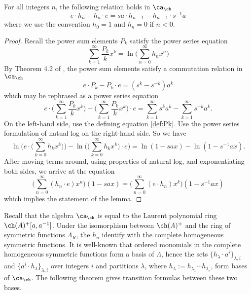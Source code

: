 \begin{lemma} \label{lem:homfly1}
For all integers $n$, the following relation holds in $\ca_\ch$
\begin{equation}
e \cdot h_n - h_n \cdot e = s a \cdot h_{n-1} - h_{n-1} \cdot  s^{-1} a
\end{equation}
where we use the convention $h_0 = 1$ and $h_n = 0$ if $n < 0$. 
\end{lemma}
\begin{proof}
Recall the power sum elements $P_k$ satisfy the power series equation
\begin{equation} \label{def:Pk}
\sum_{k=1}^\infty \frac{P_k}{k} x^k = \ln \Big( \sum_{n=0}^\infty h_n x^n \Big)
\end{equation}
By Theorem 4.2 of \cite{Mor02b}, the power sum elements satisfy a commutation relation in $\ca_\ch$
\begin{equation}
e \cdot P_k - P_k \cdot e = (s^{k} - s^{-k}) a^k
\end{equation} 
which may be rephrased as a power series equation 
\[
e \cdot \Big( \sum_{k=1}^\infty \frac{P_k}{k} x^k \Big) - \Big( \sum_{k=1}^\infty \frac{P_k}{k} x^k \Big) \cdot e = \sum_{k=1}^\infty s^k a^k - \sum_{k=1}^\infty s^{-k} a^k.
\]
On the left-hand side, use the defining equation \eqref{def:Pk}. Use the power series formulation of natual log on the right-hand side. So we have
\[
\ln \Bigg( e \cdot \Big( \sum_{k=0}^\infty h_k x^k \Big) \Bigg) - \ln \Bigg( \Big( \sum_{k=0}^\infty h_k x^k \Big) \cdot e \Bigg) = \ln ( 1 - s a x ) - \ln ( 1 - s^{-1} a x ).
\]
After moving terms around, using properties of natural log, and exponentiating both sides, we arrive at the equation
\[
\Big( \sum_{n=0}^\infty (h_n \cdot e ) x^n \Big) ( 1 - s a x ) = \Big( \sum_{n=0}^\infty ( e \cdot h_n ) x^k \Big) ( 1 - s^{-1} a x )
\]
which implies the statement of the lemma.
\end{proof}

Recall that the algebra $\ca_\ch$ is equal to the Laurent polynomial ring $\ch(A)^+[a, a^{-1}]$. Under the isomorphism between $\ch(A)^+$ and the ring of symmetric functions $\Lambda_R$, the $h_n$ identify with the complete homogeneous symmetric functions. It is well-known that ordered monomials in the complete homogeneous symmetric functions form a basis of $\Lambda$, hence the sets $\{h_\lambda \cdot a^i \}_{\lambda, i}$ and $\{a^i \cdot h_\lambda \}_{\lambda, i}$ over integers $i$ and partitions $\lambda$, where $h_\lambda := h_{\lambda_1} \cdots h_{\lambda_r}$, form bases of $\ca_\ch$. The following theorem gives transition formulas between these two bases. 

